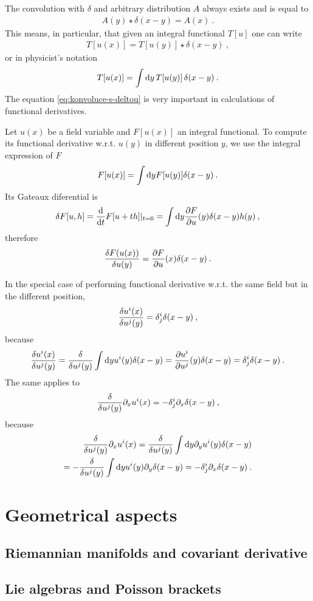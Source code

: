 The convolution with $\delta$ and arbitrary distribution $A$ always exists and is equal to
\begin{align}
    A(y) \star \delta(x-y) = A(x) \:.
\end{align}
This means, in particular, that given an integral functional $T[u]$ one can write
\begin{align}
    T[u(x)] = T[u(y)]  \star \delta(x-y)  \:,
\end{align}
or in physicist's notation
\begin{align}
    T[u(x)] = \int \mathrm{d} y \, T[u(y)] \, \delta(x-y) \:. \label{eq:konvoluce-s-deltou}
\end{align}
The equation \eqref{eq:konvoluce-s-deltou} is very important in calculations of functional derivatives.
\begin{example}
    Let $u(x)$ be a field variable and $F[u(x)]$ an integral functional. 
    To compute its functional derivative w.r.t. $u(y)$ in different position $y$, we use the integral expression of $F$
    \begin{align}
        F[u(x)] = \int \mathrm{d} y F[u(y)] \delta (x-y) \:.
    \end{align}
    Its Gateaux diferential is
    \begin{align}
        \delta F[u,h] = \frac{\mathrm{d}}{\mathrm{d}t} F[u+th]|_{t=0} = \int \mathrm{d} y \frac{\partial F}{\partial u}(y) \delta(x-y) h(y) \:,
    \end{align}
    therefore
    \begin{align}
        \frac{\delta F(u(x))}{\delta u(y)} = \frac{\partial F}{\partial u}(x) \delta(x-y) \:.
    \end{align}
\end{example}

\begin{example}
    In the special case of performing functional derivative w.r.t. the same field but in the different position,
    \begin{align}
        \frac{\delta u^i(x)}{\delta u^j(y)} = \delta^i_j \delta(x-y) \:,
    \end{align}
    because
    \begin{align}
        \frac{\delta u^i(x)}{\delta u^j(y)} = \frac{\delta }{\delta u^j(y)} \int \mathrm{d} y u^i(y) \delta (x-y) = \frac{\partial u^i}{\partial u^j}(y) \delta (x-y) = \delta^i_j \delta (x-y) \:.
    \end{align}
    The same applies to
    \begin{align}
        \frac{\delta }{\delta u^j(y)} \partial_x u^i(x) = - \delta^i_j \partial_x \delta(x-y) \:,
    \end{align}
    because
    \begin{align}
        \frac{\delta }{\delta u^j(y)} \partial_x u^i(x) = \frac{\delta }{\delta u^j(y)} \int \mathrm{d} y \partial_y u^i(y) \delta(x-y) 
        \\ = -\frac{\delta }{\delta u^j(y)} \int \mathrm{d} y u^i(y) \partial_y \delta(x-y) = - \delta^i_j \partial_x \delta(x-y) \:.
    \end{align}
\end{example}


\section{Geometrical aspects}
\subsection{Riemannian manifolds and covariant derivative}
\subsection{Lie algebras and Poisson brackets}


